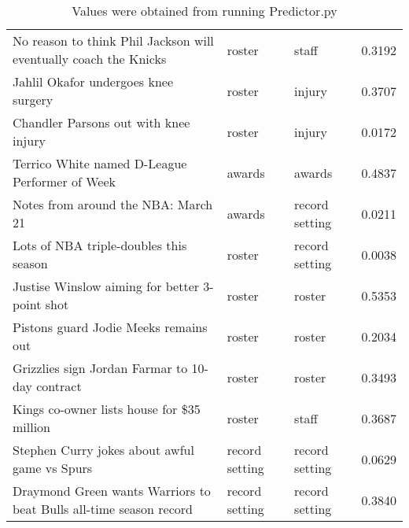 \begin{table}[!htbp]
\begin{center}
\begin{tabular}{ l l l l}
No reason to think Phil Jackson will eventually coach the Knicks & roster & staff & 0.3192\\
Jahlil Okafor undergoes knee surgery & roster & injury & 0.3707\\
Chandler Parsons out with knee injury & roster & injury & 0.0172\\
Terrico White named D-League Performer of Week & awards & awards & 0.4837\\
Notes from around the NBA: March 21 & awards & record setting & 0.0211\\
Lots of NBA triple-doubles this season & roster & record setting & 0.0038\\
Justise Winslow aiming for better 3-point shot & roster & roster & 0.5353\\
Pistons guard Jodie Meeks remains out & roster & roster & 0.2034\\
Grizzlies sign Jordan Farmar to 10-day contract & roster & roster & 0.3493\\
Kings co-owner lists house for \$35 million & roster & staff & 0.3687\\
Stephen Curry jokes about awful game vs Spurs & record setting & record setting & 0.0629\\
Draymond Green wants Warriors to beat Bulls all-time season record & record setting & record setting & 0.3840\\
\hline
		\end{tabular}
	\caption*{\scriptsize Values were obtained from running Predictor.py}
	 \end{center}
\end{table}